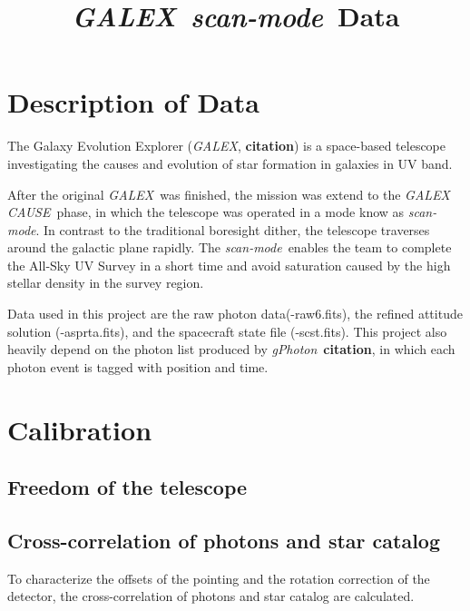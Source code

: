\documentclass[12pt, preprint]{aastex}
\newcommand{\project}[1]{\textsl{#1}}
\newcommand{\galex}{\project{GALEX}}
\newcommand{\cause}{\project{GALEX CAUSE}}
\newcommand{\scanmode}{\project{scan-mode}}
\newcommand{\gphoton}{\project{gPhoton}}
\newcommand{\todo}[1]{\textbf{#1}}
\begin{document}
\title{\galex\ \scanmode\ Data}
\author{}

\section{Description of Data}
The Galaxy Evolution Explorer (\galex, \todo{citation}) is a space-based telescope investigating the causes and evolution of star formation in galaxies in UV band.

After the original \galex\ was finished, the mission was extend to the \cause\ phase, in which the telescope was operated in a mode know as \scanmode.
In contrast to the traditional boresight dither, the telescope traverses around the galactic plane rapidly. 
The \scanmode\ enables the team to  complete the All-Sky UV Survey in a short time and avoid saturation caused by the high stellar density in the survey region.

Data used in this project are the raw photon data(-raw6.fits), the refined attitude solution (-asprta.fits), and the spacecraft state file (-scst.fits). This project also heavily depend on the photon list produced by \gphoton\ \todo{citation}, in which each photon event is tagged with position  and time.

\section{Calibration}

\subsection{Freedom of the telescope}


\subsection{Cross-correlation of photons and star catalog}
To characterize the offsets of the pointing and the rotation correction of the detector, the cross-correlation of photons and star catalog are calculated. 
\end{document}
